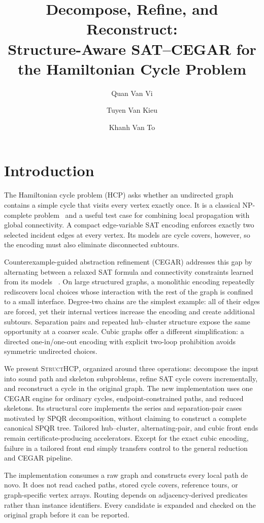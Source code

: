 \documentclass[sigconf,anonymous]{aamas}
\title[Decompose, Refine, and Reconstruct for HCP]{Decompose, Refine, and Reconstruct:\texorpdfstring{\\}{ }Structure-Aware SAT--CEGAR for the Hamiltonian Cycle Problem}
\author{Quan Van Vi}
\affiliation{
  \institution{Vietnam National University, Hanoi}
  \city{Hanoi}
  \country{Vietnam}}
\author{Tuyen Van Kieu}
\affiliation{
  \institution{Vietnam National University, Hanoi}
  \city{Hanoi}
  \country{Vietnam}}
\author{Khanh Van To}
\affiliation{
  \institution{Vietnam National University, Hanoi}
  \city{Hanoi}
  \country{Vietnam}}
\newcommand{\method}{\textsc{StructHCP}\xspace}
\begin{document}
\maketitle

\section{Introduction}
\label{sec:introduction}

The Hamiltonian cycle problem (HCP) asks whether an undirected graph
contains a simple cycle that visits every vertex exactly once. It is a
classical NP-complete problem~\cite{karp1972} and a useful test case for
combining local propagation with global connectivity. A compact
edge-variable SAT encoding enforces exactly two selected incident edges
at every vertex. Its models are cycle covers, however, so the encoding
must also eliminate disconnected subtours.

Counterexample-guided abstraction refinement (CEGAR) addresses this gap
by alternating between a relaxed SAT formula and connectivity constraints
learned from its models
~\cite{clarke2000cegar,soh2014incremental,ohashi2025cutset}. On large
structured graphs, a monolithic encoding repeatedly rediscovers local
choices whose interaction with the rest of the graph is confined to a
small interface. Degree-two chains are the simplest example: all of their
edges are forced, yet their internal vertices increase the encoding and
create additional subtours. Separation pairs and repeated hub--cluster
structure expose the same opportunity at a coarser scale. Cubic graphs
offer a different simplification: a directed one-in/one-out encoding
with explicit two-loop prohibition avoids symmetric undirected choices.

We present \method, organized around three operations: decompose the
input into sound path and skeleton subproblems, refine SAT cycle covers
incrementally, and reconstruct a cycle in the original graph. The new
implementation uses one CEGAR engine for ordinary cycles,
endpoint-constrained paths, and reduced skeletons. Its structural core
implements the series and separation-pair cases motivated by SPQR
decomposition, without claiming to construct a complete canonical SPQR
tree. Tailored hub--cluster, alternating-pair, and cubic front ends
remain certificate-producing accelerators. Except for the exact cubic
encoding, failure in a tailored front end simply transfers control to
the general reduction and CEGAR pipeline.

The implementation consumes a raw graph and constructs every local path
de novo. It does not read cached paths, stored cycle covers, reference
tours, or graph-specific vertex arrays. Routing depends on
adjacency-derived predicates rather than instance identifiers. Every
candidate is expanded and checked on the original graph before it can be
reported.
\end{document}
